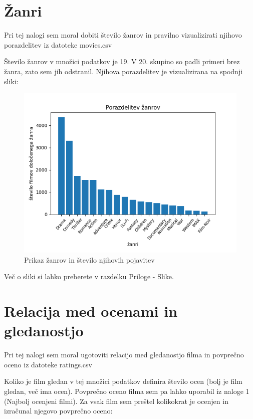 \documentclass[a4paper,11pt]{article}
\begin{document}
	\section{Žanri}
	Pri tej nalogi sem moral dobiti število žanrov in pravilno vizualizirati njihovo porazdelitev iz datoteke movies.csv
	
	Število žanrov v množici podatkov je 19. V 20. skupino so padli primeri brez žanra, zato sem jih odstranil.
	Njihova porazdelitev je vizualizirana na spodnji sliki:
	\begin{figure}[htbp]
		\begin{center}
			\includegraphics[scale=0.7]{slike/graph1_porazdelitev_zanrov.png}
			\caption{Prikaz žanrov in število njihovih pojavitev}
			\label{slika1}
		\end{center}
	\end{figure}
	Več o sliki si lahko preberete v razdelku Priloge - Slike.
	
	\section{Relacija med ocenami in gledanostjo}
	Pri tej nalogi sem moral ugotoviti relacijo med gledanostjo filma in povprečno oceno iz datoteke ratings.csv
	
	Koliko je film gledan v tej množici podatkov definira število ocen (bolj je film gledan, več ima ocen). Povprečno oceno filma sem pa lahko uporabil iz naloge 1 (Najbolj ocenjeni filmi).
	Za vsak film sem preštel kolikokrat je ocenjen in izračunal njegovo povprečno oceno:
	
\end{document}
